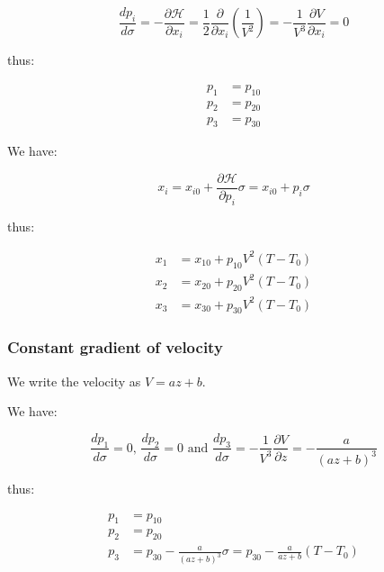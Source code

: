\documentclass[workdone.tex]{subfiles}
\begin{document}
\begin{equation}
\frac{dp_i}{d\sigma} = - \frac{\partial \mathcal H}{\partial x_i} = \frac{1}{2} \frac{\partial}{\partial x_i} (\frac{1}{V^2}) = - \frac{1}{V^3} \frac{\partial V}{\partial x_i} = 0
\end{equation}

thus:

\begin{equation}
\begin{split}
p_1 & = p_{10} \\
p_2 & = p_{20} \\
p_3 & = p_{30}
\end{split}
\end{equation}

We have:

\begin{equation}
x_i = x_{i0} + \frac{\partial \mathcal H}{\partial p_i} \sigma = x_{i0} + p_i \sigma
\end{equation}

thus:

\begin{equation}
\begin{split}
x_1 & = x_{10} + p_{10} V^2 (T - T_0) \\
x_2 & = x_{20} + p_{20} V^2 (T - T_0) \\
x_3 & = x_{30} + p_{30} V^2 (T - T_0)
\end{split}
\end{equation}

\subsubsection{Constant gradient of velocity}

We write the velocity as $V = a z + b$.

We have:

\begin{equation}
\frac{dp_1}{d\sigma} = 0 \text{, } \frac{dp_2}{d\sigma} = 0 \text{ and } \frac{dp_3}{d\sigma} = - \frac{1}{V^3} \frac{\partial V}{\partial z} = - \frac{a}{(a z + b)^3}
\end{equation}

thus:

\begin{equation}
\begin{split}
p_1 & = p_{10} \\
p_2 & = p_{20} \\
p_3 & = p_{30} - \frac{a}{(a z + b)^3} \sigma = p_{30} - \frac{a}{a z + b} (T - T_0)
\end{split}
\end{equation}
\end{document}
